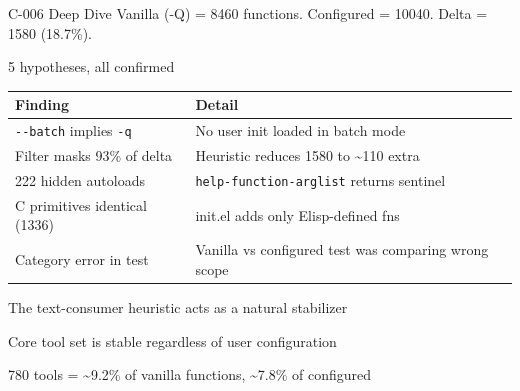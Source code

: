 \documentclass[presentation]{beamer}
\begin{document}
\begin{frame}[label={sec:org4418020},fragile]{C-006 Deep Dive}
 Vanilla (-Q) = 8460 functions. Configured = 10040. Delta = 1580 (18.7\%).
\begin{block}{5 hypotheses, all confirmed}
\begin{center}
\begin{tabular}{ll}
Finding & Detail\\
\hline
\texttt{-{}-{}batch} implies \texttt{-q} & No user init loaded in batch mode\\
Filter masks 93\% of delta & Heuristic reduces 1580 to \textasciitilde{}110 extra\\
222 hidden autoloads & \texttt{help-function-arglist} returns sentinel\\
C primitives identical (1336) & init.el adds only Elisp-defined fns\\
Category error in test & Vanilla vs configured test was comparing wrong scope\\
\end{tabular}
\end{center}
\end{block}
\begin{block}{The text-consumer heuristic acts as a natural stabilizer}
\end{block}
\begin{block}{Core tool set is stable regardless of user configuration}
\end{block}
\begin{block}{780 tools = \textasciitilde{}9.2\% of vanilla functions, \textasciitilde{}7.8\% of configured}
\end{block}
\end{frame}
\end{document}
